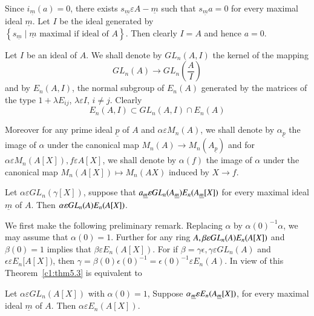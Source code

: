 \begin{Proof}
Since $i_{\underline{m}}(a)=0$, there exists
$s_{\underline{m}}\varepsilon A-\underline{m}$ such that
$s_{\underline{m}}a=0$ for every maximal ideal $\underline{m}$. Let
$I$ be the ideal generated by \\$\left\{s_{\underline{m}}\mid
\underline{m}\text{ maximal if ideal of } A\right\}$. Then clearly
$I=A$ and hence $a=0$.

Let $I$ be an ideal of $A$. We shall denote by $GL_n(A,I)$ the kernel
of the mapping 
$$
GL_n(A)\rightarrow GL_n\left(\dfrac{A}{I}\right)
$$
and by $E_n(A,I)$, the normal subgroup of $E_n(A)$ generated by the
matrices of the type $1+\lambda E_{ij}$, $\lambda \varepsilon I$,
$i\neq j$. Clearly
$$
E_n(A,I)\subset GL_n(A,I)\cap E_n(A)
$$

Moreover for any prime ideal ${\underline{p}}$ of $A$ and $\alpha
\varepsilon M_n(A)$, we shall denote by $\alpha_{\underline{p}}$ the
image of $\alpha$ under the canonical map $M_n(A)\rightarrow
M_n(A_{\underline{p}})$ and for $\alpha \varepsilon M_n(A[X]),
f\varepsilon A[X]$, we
shall denote by $\alpha(f)$ the image of $\alpha$ under the canonical
map $M_n(A[X])\mapsto M_n(A{X})$ induced by $X\rightarrow f$. 
\enprf
\end{Proof}

\begin{thm}\label{c1:thm5.3}
Let $\alpha \varepsilon GL_n(\gamma[X])$, suppose that
$a_{\underline{m}}\varepsilon\\
GL_n(A_{\underline{m}})E_n(A_{\underline{m}}[X])$ for every maximal
ideal $\underline{m}$ of $A$. Then $\alpha \varepsilon\\
GL_n(A)E_n(A[X])$.

We first make the following preliminary remark. Replacing $\alpha$ by
$\alpha(0)^{-1}\alpha$, we may assume that $\alpha(0)=1$. Further for
any ring $A,\\ \beta \varepsilon GL_n(A)E_n(A[X])$ and $\beta(0)=1$
implies that $\beta \varepsilon E_n(A[X])$. For if $\beta=\gamma
\epsilon, \gamma \varepsilon GL_n(A)$ and $\epsilon \varepsilon
E_n[A[X])$, then $\gamma=\beta(0)\epsilon (0)^{-1}=\epsilon
(0)^{-1}\varepsilon E_n(A)$.  In view of this Theorem~\ref{c1:thm5.3}
is equivalent to 
\end{thm}

\begin{Thm}
Let $\alpha \varepsilon GL_n(A[X])$ with $\alpha(0)=1$, Suppose
$\alpha_{\underline{m}}\varepsilon \\E_n(A_{\underline{m}}[X])$, for
every maximal ideal $\underline{m}$ of $A$. Then $\alpha\varepsilon E_n(A[X])$.
\end{Thm}

